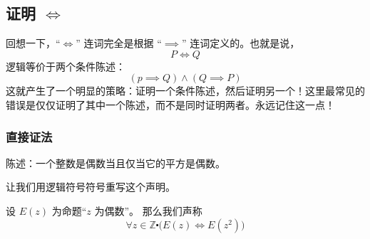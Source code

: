 \subsection{证明 $\iff$}\label{sec:section4.9.6}

回想一下，``$\iff$'' 连词完全是根据 ``$\implies$'' 连词定义的。也就是说，
\[P \iff Q\]
逻辑等价于两个条件陈述：
\[(p \implies Q) \land (Q \implies P)\]
这就产生了一个明显的策略：证明一个条件陈述，然后证明另一个！这里最常见的错误是仅仅证明了其中一个陈述，而不是同时证明两者。永远记住这一点！

\subsubsection*{直接证法}

\begin{center}
    \noindent {}
\end{center}

\newpage

\begin{example}[偶数的平方为偶数]

    陈述：一个整数是偶数当且仅当它的平方是偶数。

    让我们用逻辑符号符号重写这个声明。
    
    设 $E(z)$ 为命题``$z$ 为偶数''。 那么我们声称
    \[\forall z \in \mathbb{Z} \centerdot \Big(E(z) \iff E(z^2)\Big)\]
\end{example}

